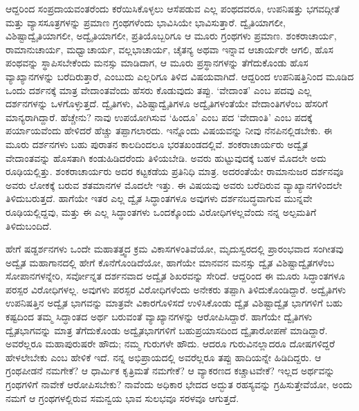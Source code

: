 ಆದ್ದರಿಂದ ಸಂಪ್ರದಾಯವಂತರೆಂದು ಕರೆಯಿಸಿಕೊಳ್ಳಲು ಆಸೆಪಡುವ ಎಲ್ಲ ಪಂಥದವರೂ, ಉಪನಿಷತ್ತು ಭಗವದ್ಗೀತೆ ಮತ್ತು ವ್ಯಾಸಸೂತ್ರಗಳನ್ನು ಪ್ರಮಾಣ ಗ್ರಂಥಗಳೆಂದು ಭಾವಿಸಿಯೇ ಭಾವಿಸುತ್ತಾರೆ. ದ್ವೈತಿಯಾಗಲೀ, ವಿಶಿಷ್ಟಾದ್ವೈತಿಯಾಗಲೀ, ಅದ್ವೈತಿಯಾಗಲೀ, ಪ್ರತಿಯೊಬ್ಬರಿಗೂ ಆ ಮೂರು ಗ್ರಂಥಗಳು ಪ್ರಮಾಣ. ಶಂಕರಾಚಾರ್ಯ, ರಾಮಾನುಚಾರ್ಯ, ಮಧ್ವಾಚಾರ್ಯ, ವಲ್ಲಭಾಚಾರ್ಯ, ಚೈತನ್ಯ ಅಥವಾ ಇನ್ನಾವ ಆಚಾರ್ಯರೇ ಆಗಲಿ, ಹೊಸ ಪಂಥವನ್ನು ಸ್ಥಾಪಿಸಬೇಕೆಂದು ಮನಸ್ಸು ಮಾಡಿದಾಗ, ಆ ಮೂರು ಪ್ರಸ್ಥಾನಗಳನ್ನು ತೆಗೆದುಕೊಂಡು ಹೊಸ ವ್ಯಾಖ್ಯಾನಗಳನ್ನು ಬರೆದಿರುತ್ತಾರೆ, ಎಂಬುದು ಎಲ್ಲರಿಗೂ ತಿಳಿದ ವಿಷಯವಾಗಿದೆ. ಆದ್ದರಿಂದ ಉಪನಿಷತ್ತಿನಿಂದ ಮೂಡಿದ ಒಂದು ದರ್ಶನಕ್ಕೆ ಮಾತ್ರ ವೇದಾಂತವೆಂದು ಹೆಸರು ಕೊಡುವುದು ತಪ್ಪು. ‘ವೇದಾಂತ’ ಎಂಬ ಪದವು ಎಲ್ಲ ದರ್ಶನಗಳನ್ನು ಒಳಗೊಳ್ಳುತ್ತದೆ. ದ್ವೈತಿಗಳು, ವಿಶಿಷ್ಟಾದ್ವೈತಿಗಳೂ ಅದ್ವೈತಿಗಳಂತೆಯೇ ವೇದಾಂತಿಗಳೆಂಬ ಹೆಸರಿಗೆ ಮಾನ್ಯರಾಗಿದ್ದಾರೆ. ಹೆಚ್ಚೇನು? ನಾವು ಉಪಯೋಗಿಸುವ ‘ಹಿಂದೂ’ ಎಂಬ ಪದ ‘ವೇದಾಂತಿ’ ಎಂಬ ಪದಕ್ಕೆ ಪರ್ಯಾಯವೆಂದು ಹೇಳಿದರೆ ಹೆಚ್ಚು ತಪ್ಪಾಗಲಾರದು. ಇನ್ನೊಂದು ವಿಷಯವನ್ನು ನೀವು ನೆನಪಿನಲ್ಲಿಡಬೇಕು. ಈ ಮೂರು ದರ್ಶನಗಳು ಬಹು ಪುರಾತನ ಕಾಲದಿಂದಲೂ ಭರತಖಂಡದಲ್ಲಿವೆ. ಶಂಕರಾಚಾರ್ಯರು ಅದ್ವೈತ ವೇದಾಂತವನ್ನು ಹೊಸತಾಗಿ ಕಂಡುಹಿಡಿದರೆಂದು ತಿಳಿಯಬೇಡಿ. ಅವರು ಹುಟ್ಟುವುದಕ್ಕೆ ಬಹಳ ಮೊದಲೇ ಅದು ರೂಢಿಯಲ್ಲಿತ್ತು. ಶಂಕರಾಚಾರ್ಯರು ಅದರ ಕಟ್ಟಕಡೆಯ ಪ್ರತಿನಿಧಿ ಮಾತ್ರ. ಅದರಂತೆಯೇ ರಾಮಾನುಜರ ದರ್ಶನವೂ ಅವರು ಲೋಕಕ್ಕೆ ಬರುವ ಶತಮಾನಗಳ ಮೊದಲೇ ಇತ್ತು. ಈ ವಿಷಯವು ಅವರು ಬರೆದಿರುವ ವ್ಯಾಖ್ಯಾನಗಳಿಂದಲೇ ತಿಳಿದುಬರುತ್ತದೆ. ಹಾಗೆಯೇ ಇತರ ಎಲ್ಲ ದ್ವೈತ ಸಿದ್ಧಾಂತಗಳೂ ಅವುಗಳು ದರ್ಶನಬದ್ಧವಾಗುವ ಮುನ್ನವೇ ರೂಢಿಯಲ್ಲಿದ್ದವು, ಮತ್ತು ಈ ಎಲ್ಲ ಸಿದ್ಧಾಂತಗಳು ಒಂದಕ್ಕೊಂದು ವಿರೋಧಿಗಳಲ್ಲವೆಂದು ನನ್ನ ಅಲ್ಪಮತಿಗೆ ತಿಳಿದುಬಂದಿದೆ. 

ಹೇಗೆ ಷಡ್ದರ್ಶನಗಳು ಒಂದೇ ಮಹಾತತ್ತ್ವದ ಕ್ರಮ ವಿಕಾಸಗಳಂತಿವೆಯೋ, ಮೃದುಸ್ವರದಲ್ಲಿ ಪ್ರಾರಂಭವಾದ ಸಂಗೀತವು ಅದ್ವೈತ ಮಹಾಗಾನದಲ್ಲಿ ಹೇಗೆ ಕೊನೆಗೊಂಡಿದೆಯೋ, ಹಾಗೆಯೇ ಮಾನವನ ಮನಸ್ಸು ದ್ವೈತ ವಿಶಿಷ್ಟಾದ್ವೈತಗಳೆಂಬ ಸೋಪಾನಗಳನ್ನೇರಿ, ಸರ್ವೋನ್ನತ ದರ್ಶನವಾದ ಅದ್ವೈತ ಶಿಖರವನ್ನು ಸೇರಿದೆ. ಆದ್ದರಿಂದ ಈ ಮೂರು ಸಿದ್ಧಾಂತಗಳೂ ಪರಸ್ಪರ ವಿರೋಧಿಗಳಲ್ಲ. ಅವುಗಳು ಪರಸ್ಪರ ವಿರೋಧಿಗಳೆಂದು ಅನೇಕರು ತಪ್ಪಾಗಿ ತಿಳಿದುಕೊಂಡಿದ್ದಾರೆ. ಅದ್ವೈತಿಗಳು ಉಪನಿಷತ್ತಿನ ಅದ್ವೈತ ಭಾಗವನ್ನು ಮಾತ್ರವೇ ವಿಕಾರಗೊಳಿಸದೆ ಉಳಿಸಿಕೊಂಡು ದ್ವೈತ ವಿಶಿಷ್ಟಾದ್ವೈತ ಭಾಗಗಳಿಗೆ ಬಹು ಕಷ್ಟದಿಂದ ತಮ್ಮ ಸಿದ್ಧಾಂತದ ಅರ್ಥ ಬರುವಂತೆ ವ್ಯಾಖ್ಯಾನಗಳನ್ನು ಆರೋಪಿಸಿದ್ದಾರೆ. ಹಾಗೆಯೇ ದ್ವೈತಿಗಳು ದ್ವೈತಭಾಗವನ್ನು ಮಾತ್ರ ತೆಗೆದುಕೊಂಡು ಅದ್ವೈತಭಾಗಗಳಿಗೆ ಬಹುಪ್ರಯಾಸದಿಂದ ದ್ವೈತಾರೋಪಣೆ ಮಾಡಿದ್ದಾರೆ. ಅವರೆಲ್ಲರೂ ಮಹಾಪುರುಷರೇ ಹೌದು; ನಮ್ಮ ಗುರುಗಳೇ ಹೌದು. ಆದರೂ ಗುರುವಿನಲ್ಲಾದರೂ ದೋಷಗಳಿದ್ದರೆ ಹೇಳಲೇಬೇಕು ಎಂಬ ಹೇಳಿಕೆ ಇದೆ. ನನ್ನ ಅಭಿಪ್ರಾಯದಲ್ಲಿ ಅವರೆಲ್ಲರೂ ತಪ್ಪು ಹಾದಿಯನ್ನೇ ಹಿಡಿದಿದ್ದರು. ಆ ಗ್ರಂಥಪೀಡನೆ ನಮಗೇಕೆ? ಆ ಧಾರ್ಮಿಕ ಕೃತ್ರಿಮತೆ ನಮಗೇಕೆ? ಆ ವ್ಯಾಕರಣದ ಕಚ್ಚಾಟವೇಕೆ? ಇಲ್ಲದ ಅರ್ಥವನ್ನು ಗ್ರಂಥಗಳಿಗೆ ನಾವೇಕೆ ಆರೋಪಿಸಬೇಕು? ನಾವೆಂದು ಅಧಿಕಾರ ಭೇದದ ಅದ್ಭುತ ರಹಸ್ಯವನ್ನು ಗ್ರಹಿಸುತ್ತೇವೆಯೋ, ಅಂದು ನಮಗೆ ಆ ಗ್ರಂಥಗಳಲ್ಲಿರುವ ಸಮನ್ವಯ ಭಾವ ಸುಲಭವೂ ಸರಳವೂ ಆಗುತ್ತದೆ. 

